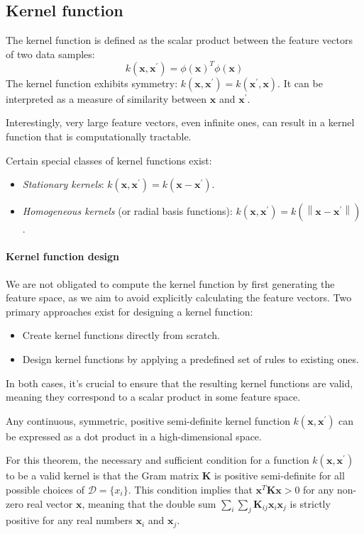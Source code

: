\subsection{Kernel function}
The kernel function is defined as the scalar product between the feature vectors of two data samples:
\[k(\textbf{x},\textbf{x}^\prime)=\phi{(\textbf{x})}^T\phi(\textbf{x})\]
The kernel function exhibits symmetry: $k(\textbf{x},\textbf{x}^\prime)=k(\textbf{x}^\prime,\textbf{x})$.
It can be interpreted as a measure of similarity between $\textbf{x}$ and $\textbf{x}^\prime$.

Interestingly, very large feature vectors, even infinite ones, can result in a kernel function that is computationally tractable.

Certain special classes of kernel functions exist:
\begin{itemize}
    \item \textit{Stationary kernels}: $k(\textbf{x},\textbf{x}^\prime)=k(\textbf{x}-\textbf{x}^\prime)$.
    \item \textit{Homogeneous kernels} (or radial basis functions): $k(\textbf{x},\textbf{x}^\prime)=k(\left\lVert \textbf{x}-\textbf{x}^\prime\right\rVert )$.
\end{itemize}

\paragraph*{Kernel function design}
We are not obligated to compute the kernel function by first generating the feature space, as we aim to avoid explicitly calculating the feature vectors.
Two primary approaches exist for designing a kernel function:
\begin{itemize}
    \item Create kernel functions directly from scratch.
    \item Design kernel functions by applying a predefined set of rules to existing ones.
\end{itemize}
In both cases, it's crucial to ensure that the resulting kernel functions are valid, meaning they correspond to a scalar product in some feature space.
\begin{theorem}[Mercer]
    Any continuous, symmetric, positive semi-definite kernel function $k(\textbf{x},\textbf{x}^\prime)$ can be expressed as a dot product in a high-dimensional space. 
\end{theorem}
For this theorem, the necessary and sufficient condition for a function $k(\textbf{x},\textbf{x}^\prime)$ to be a valid kernel is that the Gram matrix $\textbf{K}$ is positive semi-definite for all possible choices of $\mathcal{D}=\{x_i\}$.
This condition implies that $\textbf{x}^T\textbf{K}\textbf{x}>0$ for any non-zero real vector $\textbf{x}$, meaning that the double sum $\sum_i\sum_j\textbf{K}_{ij}\textbf{x}_i\textbf{x}_j$ is strictly positive for any real numbers $\textbf{x}_i$ and $\textbf{x}_j$.

